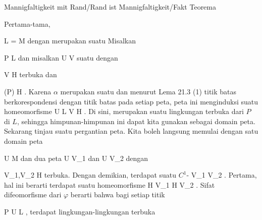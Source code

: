 {Mannigfaltigkeit mit Rand/Rand ist Mannigfaltigkeit/Fakt}
{Teorema}
{}
{

\faktzusatz {}
\faktzusatz {}

}
{

Pertama-tama,

\mavergleichskette
{\vergleichskette
{ L
}
{ = }{ \partial M
}
{  }{
}
{    }{
}
{   }{
}
}
{}{}{}
dengan
merupakan suatu
Misalkan

\mavergleichskette
{\vergleichskette
{ P
}
{ \in }{ L
}
{  }{
}
{    }{
}
{   }{
}
}
{}{}{}
dan misalkan
\maabbdisp {\alpha} { U } { V
} {}
suatu
dengan

\mavergleichskette
{\vergleichskette
{ V
}
{ \subseteq }{ H
}
{  }{
}
{    }{
}
{   }{
}
}
{}{}{}
terbuka dan

\mavergleichskette
{\vergleichskette
{ \alpha(P)
}
{ \in }{ \partial H
}
{  }{
}
{    }{
}
{   }{
}
}
{}{}{.}
Karena $\alpha$ merupakan suatu
dan menurut
Lema 21.3 (1)
titik batas berkorespondensi dengan titik batas pada setiap peta, peta ini menginduksi suatu homeomorfisme
\maabbdisp {} {U \cap L} {V \cap \partial H
} {.}
Di sini,
 merupakan suatu lingkungan terbuka dari $P$ di $L$, sehingga himpunan-himpunan ini dapat kita gunakan sebagai domain peta. Sekarang tinjau suatu pergantian peta. Kita boleh langsung memulai dengan satu domain peta

\mavergleichskette
{\vergleichskette
{ U
}
{ \subseteq }{ M
}
{  }{
}
{    }{
}
{   }{
}
}
{}{}{}
dan dua peta
 { U } { V_1
} {} dan  { U } { V_2
} {}
dengan

\mavergleichskette
{\vergleichskette
{ V_1,V_2
}
{ \subseteq }{ H
}
{  }{
}
{    }{
}
{   }{
}
}
{}{}{}
terbuka. Dengan demikian, terdapat suatu
$C^1$-
 {V_1 } { V_2
} {.}
Pertama, hal ini berarti terdapat suatu homeomorfisme
\maabb {} { \partial H \cap V_1 } { \partial H \cap V_2
} {.}
Sifat difeomorfisme dari $\varphi$ berarti bahwa bagi setiap titik

\mavergleichskette
{\vergleichskette
{ P
}
{ \in }{ U \cap L
}
{  }{
}
{    }{
}
{   }{
}
}
{}{}{,}
terdapat lingkungan-lingkungan terbuka

}
